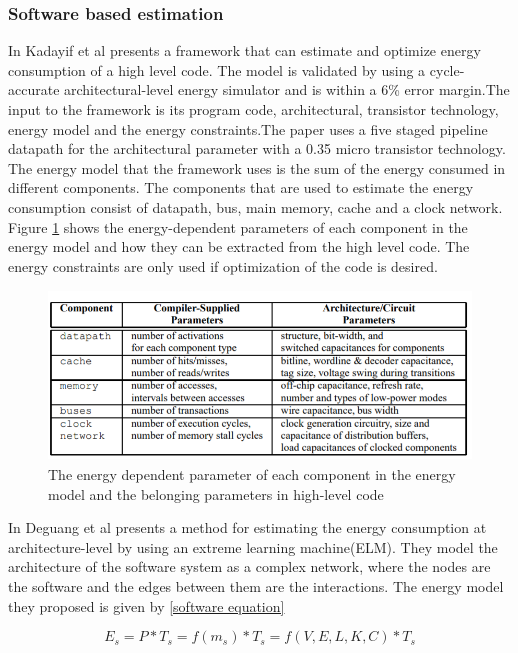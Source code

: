 \subsubsection{Software based estimation}

In \cite{EAC} Kadayif et al presents a framework that can estimate and optimize energy consumption of a high level code. The model is validated by using a cycle-accurate architectural-level energy simulator and is within a 6\% error margin.The input to the framework is its program code, architectural, transistor technology, energy model and the energy constraints.The paper uses a five staged pipeline datapath for the architectural parameter with a 0.35 micro transistor technology. The energy model that the framework uses is the sum of the energy consumed in different components. The components that are used to estimate the energy consumption consist of datapath, bus, main memory, cache and a clock network. Figure \ref{fig:EAC_table} shows the energy-dependent parameters of each component in the energy model and how they can be extracted from the high level code. The energy constraints are only used if optimization of the code is desired. 

\begin{figure}[H]
\centering
\includegraphics[height=4.5cm]{Project_Report/Images/EAC_table.PNG}
\caption{The energy dependent parameter of each component in the energy model and the belonging parameters in high-level code \cite{EAC}}
\label{fig:EAC_table}
\end{figure}
In \cite{Software Energy} Deguang et al presents a method for estimating the energy consumption at architecture-level by using an extreme learning machine(ELM).  They model the architecture of the software system as a complex network, where the nodes are the software and the edges between them are the interactions. The energy model they proposed is given by \ref{software equation}

\begin{equation}
 E_{s}= P*T_{s} = f(m_{s})*T_{s}=f(V,E,L,K,C)*T_{s}
\label{software equation}
\end{equation}

